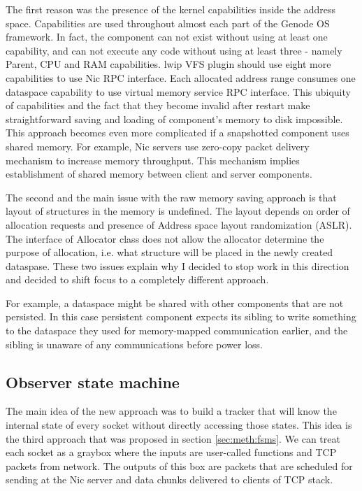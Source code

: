 The first reason was the presence of the kernel capabilities inside the address
space. Capabilities are used throughout almost each part of the Genode OS
framework. In fact, the component can not exist without using at least one
capability, and can not execute any code without using at least three - namely
Parent, CPU and RAM capabilities. lwip VFS plugin should use eight more
capabilities to use Nic RPC interface. Each allocated address range consumes
one dataspace capability to use virtual memory service RPC interface. This
ubiquity of capabilities and the fact that they become invalid after restart
make straightforward saving and loading of component's memory to disk
impossible. This approach becomes even more complicated if a snapshotted
component uses shared memory. For example, Nic servers use zero-copy packet
delivery mechanism to increase memory throughput. This mechanism implies
establishment of shared memory between client and server components.

The second and the main issue with the raw memory saving approach is that
layout of structures in the memory is undefined. The layout depends on order
of allocation requests and presence of Address space layout randomization
(ASLR). The interface of Allocator class does not allow the allocator determine
the purpose of allocation, i.e. what structure will be placed in the newly
created dataspase. These two issues explain why I decided to stop work in this
direction and decided to shift focus to a completely different approach.

For example, a dataspace might be shared with other components that
are not persisted. In this case persistent component expects its sibling to
write something to the dataspace they used for memory-mapped communication
earlier, and the sibling is unaware of any communications before power loss.

\subsection{Observer state machine}

The main idea of the new approach was to build a tracker that will know the
internal state of every socket without directly accessing those states. This
idea is the third approach that was proposed in section \ref{sec:meth:fsms}. 
We can treat each socket as a graybox where the inputs are user-called
functions and TCP packets from network. The outputs of this box are packets
that are scheduled for sending at the Nic server and data chunks delivered to
clients of TCP stack.

